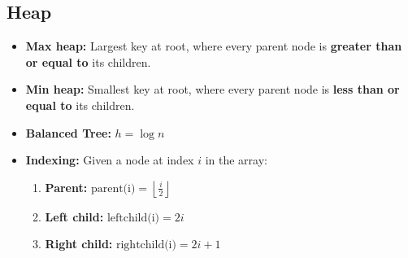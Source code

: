 \subsection{Heap}
\begin{summary}
    \begin{itemize}
        \item \textbf{Max heap:} Largest key at root, where every parent node is \textbf{greater than or equal to} its children.
        \item \textbf{Min heap:} Smallest key at root, where every parent node is \textbf{less than or equal to} its children.
        \item \textbf{Balanced Tree:} $h=\log n$
        \item \textbf{Indexing:} Given a node at index $i$ in the array:
        \begin{enumerate}
            \item \textbf{Parent:} $\text{parent(i)} = \left \lfloor \frac{i}{2} \right \rfloor$
            \item \textbf{Left child:} $\text{leftchild(i)} = 2i$
            \item \textbf{Right child:} $\text{rightchild(i)} = 2i+1$
        \end{enumerate}
    \end{itemize}
\end{summary}

